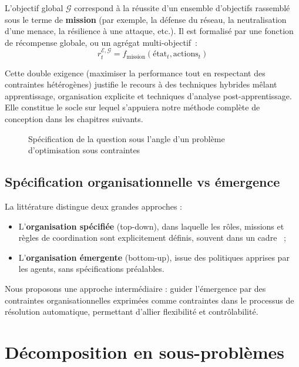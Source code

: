 \noindent L'objectif global $\mathcal{G}$ correspond à la réussite d'un ensemble d'objectifs rassemblé sous le terme de \textbf{mission} (par exemple, la défense du réseau, la neutralisation d'une menace, la résilience à une attaque, etc.). Il est formalisé par une fonction de récompense globale, ou un agrégat multi-objectif~:
%
\begin{equation*}
  r^{\mathcal{E}, \mathcal{G}}_t = f_{\text{mission}}(\text{état}_t, \text{actions}_t)
\end{equation*}

\noindent
Cette double exigence (maximiser la performance tout en respectant des contraintes hétérogènes) justifie le recours à des techniques hybrides mêlant apprentissage, organisation explicite et techniques d'analyse post-apprentissage. Elle constitue le socle sur lequel s'appuiera notre méthode complète de conception dans les chapitres suivants.

\begin{figure}[H]
  \centering
  \resizebox{\textwidth}{!}{%
    
  }
  \caption{Spécification de la question sous l'angle d'un problème d'optimisation sous contraintes}
  \label{fig:constrained_optimization_overview}
\end{figure}

\subsection{Spécification organisationnelle vs émergence}

La littérature distingue deux grandes approches :
\begin{itemize}
  \item L'\textbf{organisation spécifiée} (top-down), dans laquelle les rôles, missions et règles de coordination sont explicitement définis, souvent dans un cadre ~;
  \item L'\textbf{organisation émergente} (bottom-up), issue des politiques apprises par les agents, sans spécifications préalables.
\end{itemize}

Nous proposons une approche intermédiaire : guider l'émergence par des contraintes organisationnelles exprimées comme contraintes dans le processus de résolution automatique, permettant d'allier flexibilité et contrôlabilité.

\section{Décomposition en sous-problèmes}

